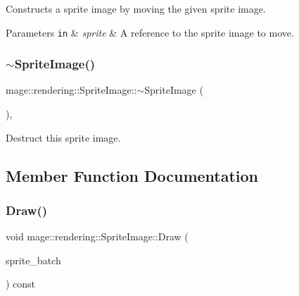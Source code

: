Constructs a sprite image by moving the given sprite image.


\begin{DoxyParams}[1]{Parameters}
\mbox{\tt in}  & {\em sprite} & A reference to the sprite image to move. \\
\hline
\end{DoxyParams}
\hypertarget{classmage_1_1rendering_1_1_sprite_image_a8723b0d72d07773eb4be1c059c7c1fb9}{}\label{classmage_1_1rendering_1_1_sprite_image_a8723b0d72d07773eb4be1c059c7c1fb9} 
\subsubsection{\texorpdfstring{$\sim$\+Sprite\+Image()}{~SpriteImage()}}
{\footnotesize\ttfamily mage\+::rendering\+::\+Sprite\+Image\+::$\sim$\+Sprite\+Image (\begin{DoxyParamCaption}{ }\end{DoxyParamCaption})\hspace{0.3cm}{\ttfamily [virtual]}, {\ttfamily [default]}}

Destruct this sprite image. 

\subsection{Member Function Documentation}
\hypertarget{classmage_1_1rendering_1_1_sprite_image_a0e4e572bae31d431f670895f98a7895e}{}\label{classmage_1_1rendering_1_1_sprite_image_a0e4e572bae31d431f670895f98a7895e} 
\subsubsection{\texorpdfstring{Draw()}{Draw()}}
{\footnotesize\ttfamily void mage\+::rendering\+::\+Sprite\+Image\+::\+Draw (\begin{DoxyParamCaption}\item[{\hyperlink{classmage_1_1rendering_1_1_sprite_batch}{Sprite\+Batch} \&}]{sprite\+\_\+batch }\end{DoxyParamCaption}) const}

